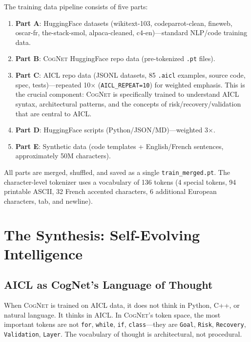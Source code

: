 \documentclass[11pt]{article}
\newcommand{\aicl}{\textsc{AICL}}
\newcommand{\cognet}{\textsc{CogNet}}
\begin{document}
The training data pipeline consists of five parts:
\begin{enumerate}[leftmargin=*,itemsep=2pt]
  \item \textbf{Part A}: HuggingFace datasets (wikitext-103, codeparrot-clean, fineweb, oscar-fr, the-stack-smol, alpaca-cleaned, c4-en)---standard NLP/code training data.
  \item \textbf{Part B}: \cognet{} HuggingFace repo data (pre-tokenized \texttt{.pt} files).
  \item \textbf{Part C}: \aicl{} repo data (JSONL datasets, 85 \texttt{.aicl} examples, source code, spec, tests)---repeated 10$\times$ (\texttt{AICL\_REPEAT=10}) for weighted emphasis. This is the crucial component: \cognet{} is specifically trained to understand \aicl{} syntax, architectural patterns, and the concepts of risk/recovery/validation that are central to \aicl{}.
  \item \textbf{Part D}: HuggingFace scripts (Python/JSON/MD)---weighted 3$\times$.
  \item \textbf{Part E}: Synthetic data (code templates + English/French sentences, approximately 50M characters).
\end{enumerate}

All parts are merged, shuffled, and saved as a single \texttt{train\_merged.pt}. The character-level tokenizer uses a vocabulary of 136 tokens (4 special tokens, 94 printable ASCII, 32 French accented characters, 6 additional European characters, tab, and newline).

\section{The Synthesis: Self-Evolving Intelligence}
\label{sec:synthesis}

\subsection{AICL as CogNet's Language of Thought}
\label{sec:synthesis:thought}

When \cognet{} is trained on \aicl{} data, it does not think in Python, C++, or natural language. It thinks in \aicl{}. In \cognet{}'s token space, the most important tokens are not \texttt{for}, \texttt{while}, \texttt{if}, \texttt{class}---they are \texttt{Goal}, \texttt{Risk}, \texttt{Recovery}, \texttt{Validation}, \texttt{Layer}. The vocabulary of thought is architectural, not procedural.
\end{document}
